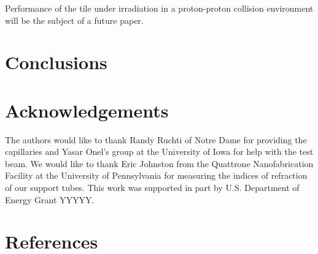 \documentclass[review]{elsarticle}
\begin{document}
Performance of the tile under irradiation in a proton-proton collision environment will be the subject of a future paper.

\section{Conclusions}

\section{Acknowledgements}
The authors would like to thank Randy Ruchti of Notre Dame for providing the capillaries and Yasar Onel's group at the University of Iowa for help with the test beam.  We would like to thank Eric Johnston from the Quattrone Nanofabrication Facility  at the University of Pennsylvania for measuring the indices of refraction of our support tubes.
This work was supported in part by U.S. Department of Energy Grant YYYYY.

\section*{References}


\end{document}
